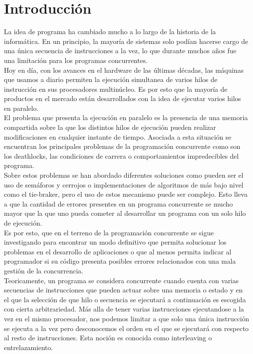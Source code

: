 \chapter{Introducción}
La idea de programa ha cambiado mucho a lo largo de la historia de la informática. En un principio, la mayoría de sistemas solo podían hacerse cargo de una única secuencia de instrucciones a la vez, lo que durante muchos años fue una limitación para los programas concurrentes.\\

Hoy en día, con los avances en el hardware de las últimas décadas, las máquinas que usamos a diario permiten la ejecución simultanea de varios hilos de instrucción en sus procesadores multinúcleo. Es por esto que la mayoría de productos en el mercado están desarrollados con la idea de ejecutar varios hilos en paralelo.\\

El problema que presenta la ejecución en paralelo es la presencia de una memoria compartida sobre la que los distintos hilos de ejecución pueden realizar modificaciones en cualquier instante de tiempo. Asociada a esta situación se encuentran los principales problemas de la programación concurrente como son los deathlocks, las condiciones de carrera o comportamientos impredecibles del programa.\\

Sobre estos problemas se han abordado diferentes soluciones como pueden ser el uso de semáforos y cerrojos o implementaciones de algoritmos de más bajo nivel como el tie-braker, pero el uso de estos mecanismo puede ser complejo. Esto lleva a que la cantidad de errores presentes en un programa concurrente se mucho mayor que la que uno pueda cometer al desarrollar un programa con un solo hilo de ejecución.\\

Es por esto, que en el terreno de la programación concurrente se sigue investigando para encontrar un modo definitivo que permita solucionar los problemas en el desarrollo de aplicaciones o que al menos permita indicar al programador si su código presenta posibles errores relacionados con una mala gestión de la concurrencia.\\

Teoricamente, un programa se considera concurrente cuando cuenta con varias secuencias de instrucciones que pueden actuar sobre una memoria o estado y en el que la selección de que hilo o secuencia se ejecutará a continuación es escogida con cierta arbitrariedad. Más alla de tener varias instrucciones ejecutandose a la vez en el mismo procesador, nos podemos limitar a que solo una única instrucción se ejecuta a la vez pero desconocemos el orden en el que se ejecutará con respecto al resto de instrucciones. Esta noción es conocida como interleaving o entrelazamiento.\\

